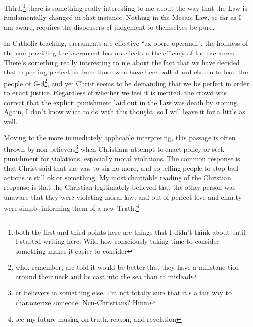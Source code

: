\documentclass[12pt]{article}[titlepage]
\newcommand{\say}[1]{``#1''}
\renewcommand{\,}{\textsuperscript{,}}
\begin{document}
Third,\footnote{both the first and third points here are things that I didn't think about until I started writing here. Wild how consciously taking time to consider something makes it easier to consider} there is something really interesting to me about the way that the Law is fundamentally changed in that instance.  
Nothing in the Mosaic Law, so far as I am aware, requires the dispensers of judgement to themselves be pure.

In Catholic teaching, sacraments are effective \say{ex opere operandi}; the holiness of the one providing the sacrament has no effect on the efficacy of the sacrament.  
There's something really interesting to me about the fact that we have decided that expecting perfection from those who have been called and chosen to lead the people of G-d\footnote{who, remember, are told it would be better that they have a millstone tied around their neck and be cast into the sea than to mislead}, and yet Christ seems to be demanding that we be perfect in order to enact justice.  
Regardless of whether we feel it is merited, the crowd was correct that the explicit punishment laid out in the Law was death by stoning.  
Again, I don't know what to do with this thought, so I will leave it for a little as well.

Moving to the more immediately applicable interpreting, this passage is often thrown by non-believers\footnote{or believers in something else. I'm not totally sure that it's a fair way to characterize someone. Non-Christians? Hmm} when Christians attempt to enact policy or seek punishment for violations, especially moral violations.  
The common response is that Christ said that she was to sin no more, and so telling people to stop bad actions is still ok or something.  
My most charitable reading of the Christian response is that the Christian legitimately believed that the other person was unaware that they were violating moral law, and out of perfect love and charity were simply informing them of a new Truth.\footnote{see my future musing on truth, reason, and revelation}
\end{document}
